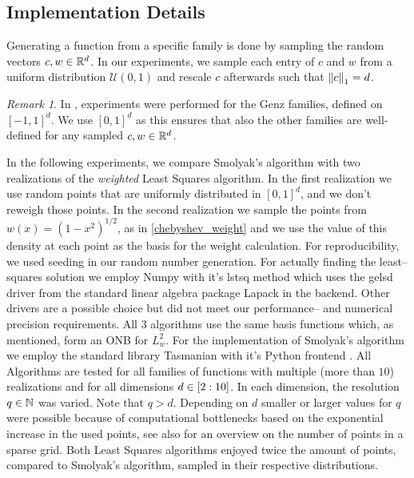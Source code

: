 \documentclass[12pt, oneside]{amsart}
\theoremstyle{definition}
\theoremstyle{remark}
\newtheorem{remark}[thm]{Remark}
\numberwithin{equation}{section}
\begin{document}
\subsection{Implementation Details}

Generating a function from a specific family is done 
by sampling the random vectors $c, w \in\R^d$. In our experiments, we sample 
each entry of $c$ and $w$ from a uniform distribution $\mathcal{U}(0,1)$ and 
rescale $c$ afterwards such that $\norm[1]{c}=d$.

\begin{remark}
	In \cite{BarthelmannHighDim_2000}, experiments were performed for the Genz 
	families, defined on $[-1,1]^d$. We use $[0,1]^d$ as this ensures that also 
	the other families are well-defined for any sampled $c,w\in\R^d$.
\end{remark}

In the following experiments, we compare Smolyak's algorithm with two 
realizations of the \emph{weighted} Least Squares algorithm. In the first 
realization we use random points that are uniformly distributed in $[0,1]^d$, 
and we don't reweigh those points. In the second realization we sample the 
points from $w(x) = (1-x^2)^{1/2}$, as in \ref{chebyshev_weight} and we use the value of 
this density at each point as the basis for the weight calculation.
For reproducibility, we used seeding in our random number generation.
For actually finding the least--squares solution we employ Numpy \cite{HarrisNumpy_2020} with it's \textrm{lstsq} method which uses the \textrm{gelsd} driver from the standard linear algebra package Lapack \cite{lapack99} in the backend.
Other drivers are a possible choice but did not meet our performance-- and numerical precision requirements.
All 3 algorithms use the same basis functions  which, as mentioned, form an ONB for \(L^2_w\). For the implementation of Smolyak's algorithm we employ the standard library Tasmanian with it's Python frontend \cite{stoyanov2015tasmanian,stoyanov2016dynamically,stoyanov2018adaptive,morrow2019method,doecode_6305}.
All Algorithms are tested for all families of functions with multiple (more than \(10\)) 
realizations and for all dimensions $d\in \indexset[2]{10}$. In each dimension, 
the resolution $q\in\N$ was varied. Note that $q>d$. Depending on $d$ 
smaller or larger values for $q$ were possible because of computational 
bottlenecks based on the exponential increase in the used points, see also 
\cite{BurkardtCounting_2014} for an overview on the number of points in a sparse 
grid. Both Least Squares algorithms enjoyed twice the amount of points, 
compared to Smolyak's algorithm, sampled in their respective distributions.
\end{document}
